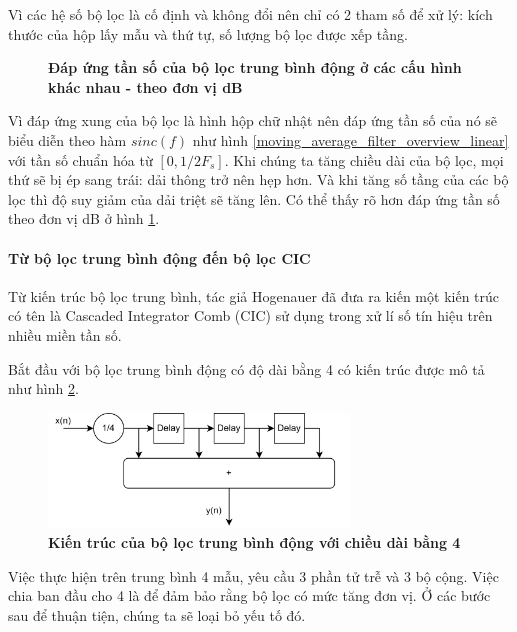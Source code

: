Vì các hệ số bộ lọc là cố định và không đổi nên chỉ có 2 tham số để xử lý: kích thước của hộp lấy mẫu và thứ tự, số lượng bộ lọc được xếp tầng.
\begin{figure}[H]
    \centering
    
    \caption[Đáp ứng tần số của bộ lọc trung bình động ở các cấu hình khác nhau - theo đơn vị dB]{\bfseries \fontsize{12pt}{0pt}\selectfont Đáp ứng tần số của bộ lọc trung bình động ở các cấu hình khác nhau - theo đơn vị dB}
    \label{moving_average_filter_overview}
\end{figure}
Vì đáp ứng xung của bộ lọc là hình hộp chữ nhật nên đáp ứng tần số của nó sẽ biểu diễn theo hàm $sinc(f)$ như hình \ref{moving_average_filter_overview_linear} với tần số chuẩn hóa từ $[0, 1/2 F_s]$. Khi chúng ta tăng chiều dài của bộ lọc, mọi thứ sẽ bị ép sang trái: dải thông trở nên hẹp hơn. Và khi tăng số tầng của các bộ lọc thì độ suy giảm của dải triệt sẽ tăng lên. Có thể thấy rõ hơn đáp ứng tần số theo đơn vị dB ở hình \ref{moving_average_filter_overview}.

\paragraph{Từ bộ lọc trung bình động đến bộ lọc CIC}
Từ kiến trúc bộ lọc trung bình, tác giả Hogenauer đã đưa ra kiến một kiến trúc có tên là Cascaded Integrator Comb (CIC) sử dụng trong xử lí số tín hiệu trên nhiều miền tần số\cite{CIC}.

Bắt đầu với bộ lọc trung bình động có độ dài bằng 4 có kiến trúc được mô tả như hình \ref{cic_1}.
\begin{figure}[H]
    \centering
    \includegraphics[width=8cm]{Images/Chuong2/cic/cic_1.png}
    \caption[Kiến trúc của bộ lọc trung bình động với chiều dài bằng 4]{\bfseries \fontsize{12pt}{0pt}\selectfont Kiến trúc của bộ lọc trung bình động với chiều dài bằng 4}
    \label{cic_1}
\end{figure}

Việc thực hiện trên trung bình 4 mẫu, yêu cầu 3 phần tử trễ và 3 bộ cộng. Việc chia ban đầu cho 4 là để đảm bảo rằng bộ lọc có mức tăng đơn vị. Ở các bước sau để thuận tiện, chúng ta sẽ loại bỏ yếu tố đó.

